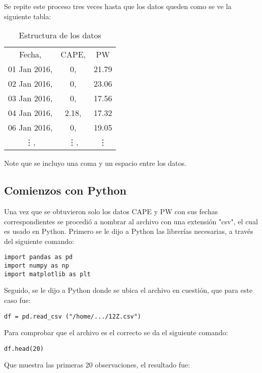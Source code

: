 \documentclass[12pt,letterpaper]{article}
\begin{document}
Se repite este proceso tres veces hasta que los datos queden como se ve la siguiente tabla:
\begin{table}[H]
\centering
\begin{tabular}{|ccc|}
\hline
Fecha,& CAPE,& PW\\
01 Jan 2016,&	0,&	21.79\\
02 Jan 2016,&	0,&	23.06\\
03 Jan 2016,&	0,&	17.56\\
04 Jan 2016,&	2.18,&	17.32\\
06 Jan 2016,&	0,&	19.05\\
\vdots,& \vdots,& \vdots\\
\hline
\end{tabular}
\caption{Estructura de los datos}
\end{table}

Note que se incluyo una coma y un espacio entre los datos.


\subsection{Comienzos con Python}

Una vez que se obtuvieron solo los datos CAPE y PW con sus fechas correspondientes se procedió a nombrar al archivo con una extensión "csv", el cual es usado en Python. Primero se le dijo a Python las librerías necesarias, a través del siguiente comando: \\

\begin{verbatim}
import pandas as pd
import numpy as np
import matplotlib as plt
\end{verbatim}

Seguido, se le dijo a Python donde se ubica el archivo en cuestión, que para este caso fue:\\

\begin{verbatim}
df = pd.read_csv ("/home/.../12Z.csv")
\end{verbatim}

Para comprobar que el archivo es el correcto se da el siguiente comando:\\

\begin{verbatim}
df.head(20)
\end{verbatim}

Que muestra las primeras 20 observaciones, el resultado fue:\\\
\end{document}
